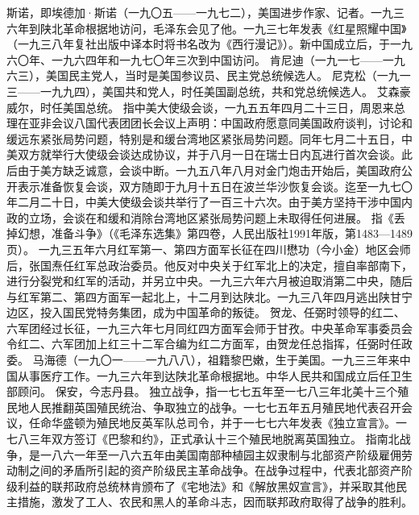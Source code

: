 \begin{maonote}
斯诺，即埃德加·斯诺（一九〇五——一九七二），美国进步作家、记者。一九三六年到陕北革命根据地访问，毛泽东会见了他。一九三七年发表《红星照耀中国》（一九三八年复社出版中译本时将书名改为《西行漫记》）。新中国成立后，于一九六〇年、一九六四年和一九七〇年三次到中国访问。
肯尼迪（一九一七——一九六三），美国民主党人，当时是美国参议员、民主党总统候选人。
尼克松（一九一三——一九九四），美国共和党人，时任美国副总统，共和党总统候选人。
艾森豪威尔，时任美国总统。
指中美大使级会谈，一九五五年四月二十三日，周恩来总理在亚非会议八国代表团团长会议上声明：中国政府愿意同美国政府谈判，讨论和缓远东紧张局势问题，特别是和缓台湾地区紧张局势问题。同年七月二十五日，中美双方就举行大使级会谈达成协议，并于八月一日在瑞士日内瓦进行首次会谈。此后由于美方缺乏诚意，会谈中断。一九五八年八月对金门炮击开始后，美国政府公开表示准备恢复会谈，双方随即于九月十五日在波兰华沙恢复会谈。迄至一九七〇年二月二十日，中美大使级会谈共举行了一百三十六次。由于美方坚持干涉中国内政的立场，会谈在和缓和消除台湾地区紧张局势问题上未取得任何进展。
指《丢掉幻想，准备斗争》（《毛泽东选集》第四卷，人民出版社1991年版，第1483—1489页）。
一九三五年六月红军第一、第四方面军长征在四川懋功（今小金）地区会师后，张国焘任红军总政治委员。他反对中央关于红军北上的决定，擅自率部南下，进行分裂党和红军的活动，并另立中央。一九三六年六月被迫取消第二中央，随后与红军第二、第四方面军一起北上，十二月到达陕北。一九三八年四月逃出陕甘宁边区，投入国民党特务集团，成为中国革命的叛徒。
贺龙、任弼时领导的红二、六军团经过长征，一九三六年七月同红四方面军会师于甘孜。中央革命军事委员会令红二、六军团加上红三十二军合编为红二方面军，由贺龙任总指挥，任弼时任政委。
马海德（一九〇一——一九八八），祖籍黎巴嫩，生于美国。一九三三年来中国从事医疗工作。一九三六年到达陕北革命根据地。中华人民共和国成立后任卫生部顾问。
保安，今志丹县。
独立战争，指一七七五年至一七八三年北美十三个殖民地人民推翻英国殖民统治、争取独立的战争。一七七五年五月殖民地代表召开会议，任命华盛顿为殖民地反英军队总司令，并于一七七六年发表《独立宣言》。一七八三年双方签订《巴黎和约》，正式承认十三个殖民地脱离英国独立。
指南北战争，是一八六一年至一八六五年由美国南部种植园主奴隶制与北部资产阶级雇佣劳动制之间的矛盾所引起的资产阶级民主革命战争。在战争过程中，代表北部资产阶级利益的联邦政府总统林肯颁布了《宅地法》和《解放黑奴宣言》，并采取其他民主措施，激发了工人、农民和黑人的革命斗志，因而联邦政府取得了战争的胜利。
\end{maonote}
